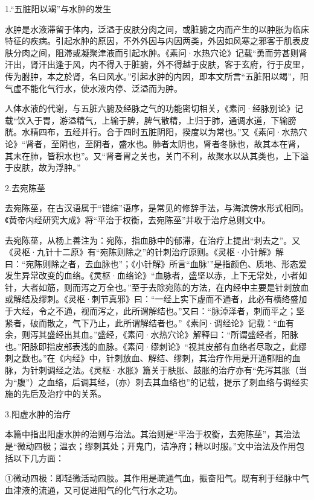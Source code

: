 \documentclass[draft,12pt]{ctexbook}
\begin{document}

1.“五脏阳以竭”与水肿的发生

水肿是水液滞留于体内，泛溢于皮肤分肉之间，或脏腑之内而产生的以肿胀为临床特征的疾病。引起水肿的原因，不外外因与内因两类，外因如风寒之邪客于肌表皮肤分肉之间，阻滞或凝聚津液而引起水肿。《素问·水热穴论》记载“勇而劳甚则肾汗出，肾汗出逢于风，内不得入于脏腑，外不得越于皮肤，客于玄府，行于皮里，传为胕肿，本之於肾，名曰风水。”引起水肿的内因，即本文所言“五脏阳以竭”，阳气虚不能化气行水，使水液内停、泛溢而为肿。

人体水液的代谢，与五脏六腑及经脉之气的功能密切相关，《素问·经脉别论》记载“饮入于胃，游溢精气，上输于脾，脾气散精，上归于肺，通调水道，下输膀胱。水精四布，五经并行。合于四时五脏阴阳，揆度以为常也。”又《素问·水热穴论》“肾者，至阴也，至阴者，盛水也。肺者太阴也，肾者冬脉也，故其本在肾，其末在肺，皆积水也”。又“肾者胃之关也，关门不利，故聚水以从其类也，上下溢于皮肤，故为浮肿。”

2.去宛陈莝

去宛陈莝，在古汉语属于“错综”语序，是常见的修辞手法，与海滨傍水形式相同。《黄帝内经研究大成》将“平治于权衡，去宛陈莝”并收于治疗总则文中。

去宛陈莝，从杨上善注为：宛陈，指血脉中的郁滞，在治疗上提出“刺去之”。又《灵枢·九针十二原》有“宛陈则除之”的针刺治疗原则。《灵枢·小针解》解曰：“宛陈则除之者，去血脉也”；《小针解》所言“血脉'”是指颜色、质地、形态爰发生异常改变的血络。《灵枢·血络论》“血脉者，盛坚以赤，上下无常处，小者如针，大者如筋，则而泻之万全也。”至于去除宛陈的方法，在内经中主要是针刺放血或解结及缪刺。《灵枢·刺节真邪》曰：“一经上实下虚而不通者，此必有横络盛加于大经，令之不通，视而泻之，此所谓解结也。”又曰：“脉淖泽者，刺而平之；坚紧者，破而散之，气下乃止，此所谓解结者也。”《素问·调经论》记载：“血有余，则泻其盛经出其血。”盛经，《素问·水热穴论》解释曰：“所谓盛经者，阳脉也。”阳脉即指皮部表浅的血脉。《素问·缪刺论》“视其皮部有血络者尽取之，此缪刺之数也。”在《内经》中，针刺放血、解结、缪刺，其治疗作用是开通郁阻的血脉，为针刺调经之法。《灵枢·水胀》篇关于肤胀、鼓胀的治疗亦有“先泻其胀（当为“腹”）之血络，后调其经，（亦）刺去其血络也”的记载，提示了刺血络与调经实施的先后及治疗中的关系。

3.阳虚水肿的治疗

本篇中指出阳虚水肿的治则与治法。其治则是“平治于权衡，去宛陈莝”，其治法是“微动四极；温衣；缪刺其处；开鬼门，洁净府；精以时服。”文中治法及作用包括以下几方面：

①微动四极：即轻微活动四肢。其作用是疏通气血，振奋阳气。既有利于经脉中气血津液的流通，又可促进阳气的化气行水之功。
\end{document}
